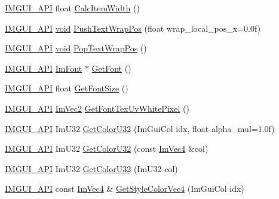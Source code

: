 \begin{DoxyCompactItemize}
\hyperlink{imgui_8h_a43829975e84e45d1149597467a14bbf5}{I\+M\+G\+U\+I\+\_\+\+A\+PI} float \hyperlink{namespaceImGui_ab3b3ba92ebd8bca4a552dd93321a1994}{Calc\+Item\+Width} ()
\item 
\hyperlink{imgui_8h_a43829975e84e45d1149597467a14bbf5}{I\+M\+G\+U\+I\+\_\+\+A\+PI} \hyperlink{imgui__impl__opengl3__loader_8h_ac668e7cffd9e2e9cfee428b9b2f34fa7}{void} \hyperlink{namespaceImGui_a72ba065ae9819aaed3af68c113d2758b}{Push\+Text\+Wrap\+Pos} (float wrap\+\_\+local\+\_\+pos\+\_\+x=0.\+0f)
\item 
\hyperlink{imgui_8h_a43829975e84e45d1149597467a14bbf5}{I\+M\+G\+U\+I\+\_\+\+A\+PI} \hyperlink{imgui__impl__opengl3__loader_8h_ac668e7cffd9e2e9cfee428b9b2f34fa7}{void} \hyperlink{namespaceImGui_a08000421b9cc13757430efe54178ae0f}{Pop\+Text\+Wrap\+Pos} ()
\item 
\hyperlink{imgui_8h_a43829975e84e45d1149597467a14bbf5}{I\+M\+G\+U\+I\+\_\+\+A\+PI} \hyperlink{structImFont}{Im\+Font} $\ast$ \hyperlink{namespaceImGui_a43cf349576e20fac4a1300269320ad8f}{Get\+Font} ()
\item 
\hyperlink{imgui_8h_a43829975e84e45d1149597467a14bbf5}{I\+M\+G\+U\+I\+\_\+\+A\+PI} float \hyperlink{namespaceImGui_ac592ae8e0aa4a1a06502ec7872bc8da8}{Get\+Font\+Size} ()
\item 
\hyperlink{imgui_8h_a43829975e84e45d1149597467a14bbf5}{I\+M\+G\+U\+I\+\_\+\+A\+PI} \hyperlink{structImVec2}{Im\+Vec2} \hyperlink{namespaceImGui_a3092da6abc1d04f3287c084435dc6026}{Get\+Font\+Tex\+Uv\+White\+Pixel} ()
\item 
\hyperlink{imgui_8h_a43829975e84e45d1149597467a14bbf5}{I\+M\+G\+U\+I\+\_\+\+A\+PI} Im\+U32 \hyperlink{namespaceImGui_a0de2d9bd347d9866511eb8d014e62556}{Get\+Color\+U32} (Im\+Gui\+Col idx, float alpha\+\_\+mul=1.\+0f)
\item 
\hyperlink{imgui_8h_a43829975e84e45d1149597467a14bbf5}{I\+M\+G\+U\+I\+\_\+\+A\+PI} Im\+U32 \hyperlink{namespaceImGui_ac701752365ddd58cecc1956fc62921a8}{Get\+Color\+U32} (const \hyperlink{structImVec4}{Im\+Vec4} \&col)
\item 
\hyperlink{imgui_8h_a43829975e84e45d1149597467a14bbf5}{I\+M\+G\+U\+I\+\_\+\+A\+PI} Im\+U32 \hyperlink{namespaceImGui_a834649713437e8fdfa0e5a4fb780d35b}{Get\+Color\+U32} (Im\+U32 col)
\item 
\hyperlink{imgui_8h_a43829975e84e45d1149597467a14bbf5}{I\+M\+G\+U\+I\+\_\+\+A\+PI} const \hyperlink{structImVec4}{Im\+Vec4} \& \hyperlink{namespaceImGui_ad838e580972e2c4b3da2b0f60754b662}{Get\+Style\+Color\+Vec4} (Im\+Gui\+Col idx)
\item 

\end{DoxyCompactItemize}
